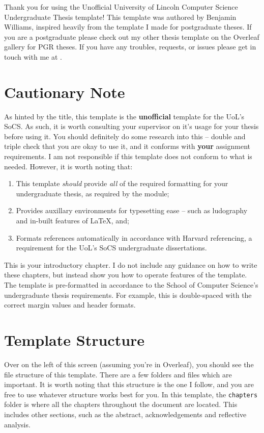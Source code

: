 Thank you for using the Unofficial University of Lincoln Computer Science Undergraduate Thesis template! This template was authored by Benjamin Williams, inspired heavily from the template I made for postgraduate theses. If you are a postgraduate please check out my other thesis template on the Overleaf gallery for PGR theses. If you have any troubles, requests, or issues please get in touch with me at .

\section{Cautionary Note}
As hinted by the title, this template is the \textbf{unofficial} template for the UoL's SoCS. As such, it is worth consulting your supervisor on it's usage for your thesis before using it. You should definitely do some research into this -- double and triple check that you are okay to use it, and it conforms with \textbf{your} assignment requirements. I am not responsible if this template does not conform to what is needed. However, it is worth noting that:

\begin{enumerate}
    \item This template \emph{should} provide \emph{all} of the required formatting for your undergraduate thesis, as required by the module;
    \item Provides auxillary environments for typesetting ease -- such as ludography and in-built features of \LaTeX, and;
    \item Formats references automatically in accordance with Harvard referencing, a requirement for the UoL's SoCS undergraduate dissertations.
\end{enumerate}


This is your introductory chapter. I do not include any guidance on how to write these chapters, but instead show you how to operate features of the template. The template is pre-formatted in accordance to the School of Computer Science's undergraduate thesis requirements. For example, this is double-spaced with the correct margin values and header formats. 

\section{Template Structure}
Over on the left of this screen (assuming you're in Overleaf), you should see the file structure of this template. There are a few folders and files which are important. It is worth noting that this structure is the one I follow, and you are free to use whatever structure works best for you. In this template, the \texttt{chapters} folder is where all the chapters throughout the document are located. This includes other sections, such as the abstract, acknowledgements and reflective analysis.

